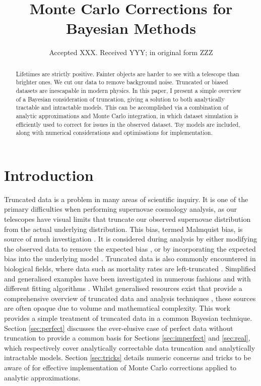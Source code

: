 \documentclass[a4paper,fleqn,usenatbib]{mnras}
\title[MC Corrections for Bayesian Methods]{Monte Carlo Corrections for Bayesian Methods}
\author[S. R. Hinton et al.]{Samuel R. Hinton,$^{1,2}$\thanks{E-mail: \href{samuelreay@gmail.com}}
\\
$^{1}$School of Mathematics and Physics, The University of Queensland, Brisbane, QLD 4072, Australia\\
$^{2}$ARC Centre of Excellence for All-sky Astrophysics (CAASTRO)
}
\date{Accepted XXX. Received YYY; in original form ZZZ}
\begin{document}
\label{firstpage}
\pagerange{\pageref{firstpage}--\pageref{lastpage}}
\maketitle



\begin{abstract}
Lifetimes are strictly positive. Fainter objects are harder to see with a telescope than brighter ones. We cut our data to remove background noise.  Truncated or biased datasets are inescapable in modern physics. In this paper, I present a simple overview of a Bayesian consideration of truncation, giving a solution to both analytically tractable and intractable models. This can be accomplished via a combination of analytic approximations and Monte Carlo integration, in which dataset simulation is efficiently used to correct for issues in the observed dataset. Toy models are included, along with numerical considerations and optimisations for implementation.
\end{abstract}



\section{Introduction}

Truncated data is a problem in many areas of scientific inquiry. It is one of the primary difficulties when performing supernovae cosmology analysis, as our telescopes have visual limits that truncate our observed supernovae distribution from the actual underlying distribution. This bias, termed Malmquist bias, is source of much investigation \citep{Butkevich2005}. It is considered during analysis by either modifying the observed data to remove the expected bias \citep{BetouleKessler2014, ConleyGuySullivan2011}, or by incorporating the expected bias into the underlying model \citep{Rubin2015}. Truncated data is also commonly encountered in biological fields, where data such as mortality rates are left-truncated \citep{JANE1898}. Simplified and generalised examples have been investigated in numerous fashions \citep{woodroofe1985estimating, Gull1989bayesian, grogger1991models, o1995truncated} and with different fitting algorithms \citep{Gelfand1992}. Whilst generalised resources exist that provide a comprehensive overview of truncated data and analysis techniques \citep{klein2005survival}, these sources are often opaque due to volume and mathematical complexity. This work provides a simple treatment of truncated data in a common Bayesian technique. Section \ref{sec:perfect} discusses the ever-elusive case of perfect data without truncation to provide a common basis for Sections \ref{sec:imperfect} and \ref{sec:real}, which respectively cover analytically correctable data truncation and analytically intractable models. Section \ref{sec:tricks} details numeric concerns and tricks to be aware of for effective implementation of Monte Carlo corrections applied to analytic approximations.
\end{document}
